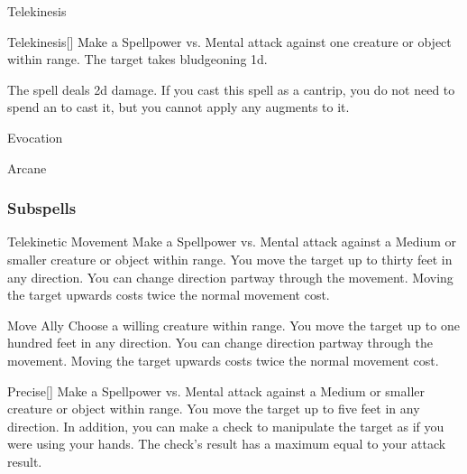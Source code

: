 \newpage
\begin{spellsection}{Telekinesis}

\begin{spellheader}
\end{spellheader}


\begin{ability}{Telekinesis}[]
Make a Spellpower vs. Mental attack against one creature or object within \rngmed range.
\hit The target takes bludgeoning  \plus1d.
\end{ability}



 The spell deals \minus2d damage. If you cast this spell as a cantrip,
you do not need to spend an  to cast it,
but you cannot apply any augments to it.


 Evocation

 Arcane
\end{spellsection}


\subsubsection{Subspells}


\begin{ability}[\nth{1}]{Telekinetic Movement}
Make a Spellpower vs. Mental attack against a Medium or smaller creature or object within \rngmed range.
\hit You move the target up to thirty feet in any direction.
You can change direction partway through the movement.
Moving the target upwards costs twice the normal movement cost.
\end{ability}
\vspace{0.25em}


\begin{ability}[\nth{2}]{Move Ally}
Choose a willing creature within \rngmed range.
You move the target up to one hundred feet in any direction.
You can change direction partway through the movement.
Moving the target upwards costs twice the normal movement cost.
\end{ability}
\vspace{0.25em}


\begin{ability}[\nth{2}]{Precise}[]
Make a Spellpower vs. Mental attack against a Medium or smaller creature or object within \rngclose range.
\hit You move the target up to five feet in any direction.
In addition, you can make a check to manipulate the target as if you were using your hands.
The check's result has a maximum equal to your attack result.
\end{ability}
\vspace{0.25em}


